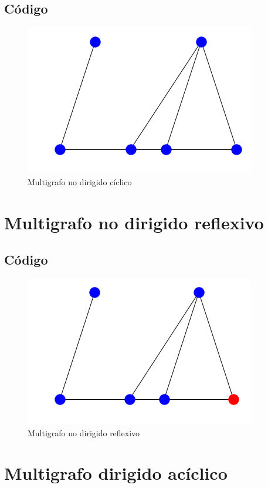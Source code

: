 \documentclass[10pt,a4paper]{article}
\begin{document}
\subsection{Código}
\begin{figure}[h]
\centering
\includegraphics[scale=.5]{multigrafonodirigidociclico}
\caption{Multigrafo no dirigido cíclico}
\end{figure}

\section{Multigrafo no dirigido reflexivo}
\subsection{Código}
\begin{figure}[H]
\centering
\includegraphics[scale=.5]{multigrafonodirigidoreflexivo}
\caption{Multigrafo no dirigido reflexivo}
\end{figure}

\section{Multigrafo dirigido acíclico}
\end{document}

